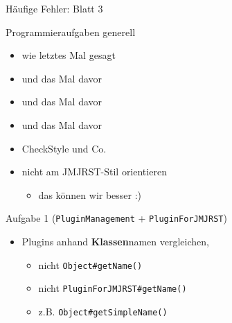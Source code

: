 \documentclass[18pt]{beamer}
\begin{document}
\begin{frame}{Häufige Fehler: Blatt 3}
\begin{block}{Programmieraufgaben generell}
	\begin{itemize}
		\item wie letztes Mal gesagt \pause
		\item und das Mal davor \pause
		\item und das Mal davor \pause
		\item und das Mal davor \pause
		\item CheckStyle und Co.
		\pause
		\item nicht am JMJRST-Stil orientieren
		\begin{itemize}
			\item das können wir besser :)
		\end{itemize}
	\end{itemize}
\end{block} 

\begin{block}{Aufgabe 1 (\texttt{PluginManagement} + \texttt{PluginForJMJRST})}
\begin{itemize}
	\pause
	\item Plugins anhand \textbf{Klassen}namen vergleichen, 
	\begin{itemize}
		\item nicht \texttt{Object\#getName()}
		\item nicht \texttt{PluginForJMJRST\#getName()}
		\item z.B. \texttt{Object\#getSimpleName()}
	\end{itemize}
\end{itemize}
\end{block}
\end{frame}
\end{document}
